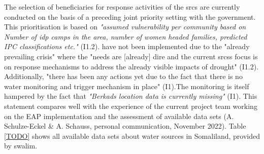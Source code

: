 The selection of beneficiaries for response activities of the \acrshort*{srcs} are currently conducted on the basis of a preceding joint priority setting with the government. This prioritisation is based on \textit{"assumed vulnerability per community based on Number of \acrfull{idp} camps in the area, number of women headed families, predicted IPC classifications etc."} (I1.2).  have not been implemented due to the "already prevailing crisis" where the "needs are [already] dire and the current \acrshort*{srcs}s focus is on response mechanisms to address the already visible impacts of drought" (I1.2). Additionally, "there has been any actions yet due to the fact that there is no water monitoring and trigger mechanism in place" (I1).The monitoring is itself hampered by the fact that \textit{"Berkads location data is currently missing"} (I1). This statement compares well with the experience of the current project team working on the EAP implementation and the assessment of available data sets (A. Schulze-Eckel \& A. Schauss, personal communication, November 2022).\newline
Table \ref*{TODO} shows all available data sets about water sources in Somaliland, provided by \acrshort*{swalim}. %



